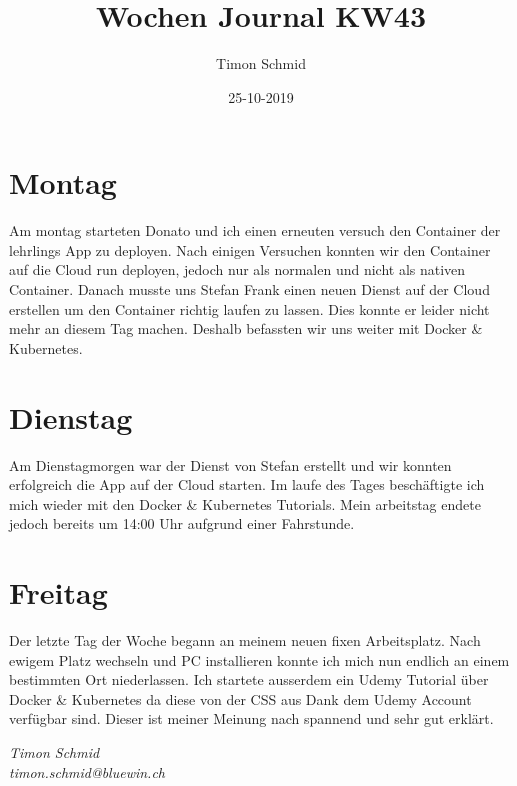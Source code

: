 \documentclass[12pt, titlepage]{article}
\title{Wochen Journal KW43}
\date{25-10-2019}
\author{Timon Schmid}
\begin{document}
    \maketitle

    \newpage


    \section{Montag}
    Am montag starteten Donato und ich einen erneuten versuch den Container der lehrlings
    App zu deployen. Nach einigen Versuchen konnten wir den Container auf die Cloud
    run deployen, jedoch nur als normalen und nicht als nativen Container. Danach musste
    uns Stefan Frank einen neuen Dienst auf der Cloud erstellen um den Container richtig
    laufen zu lassen. Dies konnte er leider nicht mehr an diesem Tag machen. Deshalb
    befassten wir uns weiter mit Docker & Kubernetes.

    \section{Dienstag}
    Am Dienstagmorgen war der Dienst von Stefan erstellt und wir konnten erfolgreich die
    App auf der Cloud starten. Im laufe des Tages beschäftigte ich mich wieder mit den
    Docker & Kubernetes Tutorials. Mein arbeitstag endete jedoch bereits um 14:00 Uhr
    aufgrund einer Fahrstunde.

    \section{Freitag}
    Der letzte Tag der Woche begann an meinem neuen fixen Arbeitsplatz. Nach ewigem Platz
    wechseln und PC installieren konnte ich mich nun endlich an einem bestimmten Ort
    niederlassen. Ich startete ausserdem ein Udemy Tutorial über Docker & Kubernetes da
    diese von der CSS aus Dank dem Udemy Account verfügbar sind. Dieser ist meiner Meinung
    nach spannend und sehr gut erklärt.

    \textit{Timon Schmid \\ timon.schmid@bluewin.ch}
\end{document}
